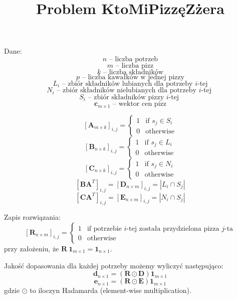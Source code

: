 \documentclass[a4paper,12pt]{article}
\title{Problem KtoMiPizzęZżera}
\date{}
\begin{document}
\maketitle

Dane:
$$
    n \text{ -- liczba potrzeb}
$$
$$
    m \text{ -- liczba pizz}
$$
$$
    k \text{ -- liczba składników}
$$
$$
    p \text{ -- liczba kawałków w jednej pizzy}
$$
$$
    L_i \text{ -- zbiór składników lubianych dla potrzeby $i$-tej}
$$
$$
    N_i \text{ -- zbiór składników nielubianych dla potrzeby $i$-tej }
$$
$$
    S_i \text{ -- zbiór składników pizzy $i$-tej }
$$
$$
    \pmb{c}_{m \times 1} \text{ -- wektor cen pizz}
$$

$$
    \left[ \pmb{A}_{m \times k} \right]_{i,j}
    = \begin{cases}
        1 & \text{if $s_j \in S_i$} \\
        0 & \text{otherwise}
    \end{cases}
$$
$$
    \left[ \pmb{B}_{n \times k} \right]_{i,j}
    = \begin{cases}
        1 & \text{if $s_j \in L_i$} \\
        0 & \text{otherwise}
    \end{cases}
$$
$$
    \left[ \pmb{C}_{n \times k} \right]_{i,j}
    = \begin{cases}
        1 & \text{if $s_j \in N_i$} \\
        0 & \text{otherwise}
    \end{cases}
$$
$$
    \left[ \pmb{B} \pmb{A}^T \right]_{i,j}
    = \left[ \pmb{D}_{n \times m} \right]_{i,j}
    = \left| L_i \cap S_j \right|
$$
$$  \left[ \pmb{C} \pmb{A}^T \right]_{i,j}
    = \left[ \pmb{E}_{n \times m} \right]_{i,j}
    = \left| N_i \cap S_j \right|
$$

Zapis rozwiązania:
$$
    \left[ \pmb{R}_{n \times m} \right]_{i,j}
    = \begin{cases}
        1 & \text{if potrzebie $i$-tej została przydzielona pizza $j$-ta} \\
        0 & \text{otherwise}
    \end{cases}
$$
przy założeniu, że $\pmb{R} ~ \pmb{1}_{m \times 1} = \pmb{1}_{n \times 1}$.

Jakość dopasowania dla każdej potrzeby możemy wyliczyć następująco:
$$
    \pmb{d}_{n \times 1} = \left( \pmb{R} \odot \pmb{D} \right) \pmb{1}_{m \times 1}
$$
$$
    \pmb{e}_{n \times 1} = \left( \pmb{R} \odot \pmb{E} \right) \pmb{1}_{m \times 1}
$$
gdzie $\odot$ to iloczyn Hadamarda (element-wise multiplication).
\end{document}
